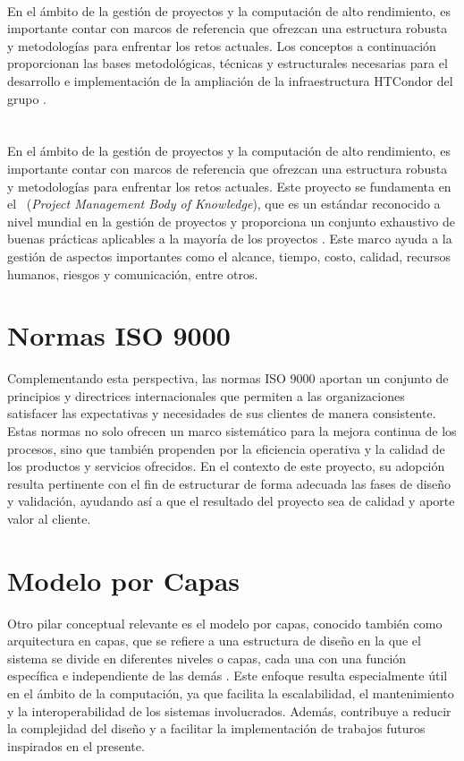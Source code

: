 \label{cap:marcoTeorico}
\mbox{}\\
\noindent
En el ámbito de la gestión de proyectos y la computación de alto rendimiento, es importante contar con marcos de referencia que ofrezcan una estructura robusta y metodologías para enfrentar los retos actuales. Los conceptos a continuación proporcionan las bases metodológicas, técnicas y estructurales necesarias para el desarrollo e implementación de la ampliación de la infraestructura HTCondor del grupo \GRID.

\section{\PMBOK}
\noindent
En el ámbito de la gestión de proyectos y la computación de alto rendimiento, es importante contar con marcos de referencia que ofrezcan una estructura robusta y metodologías para enfrentar los retos actuales. Este proyecto se fundamenta en el \PMBOK~(\textit{Project Management Body of Knowledge}), que es un estándar reconocido a nivel mundial en la gestión de proyectos y proporciona un conjunto exhaustivo de buenas prácticas aplicables a la mayoría de los proyectos \citep{PMI2019}. Este marco ayuda a la gestión de aspectos importantes como el alcance, tiempo, costo, calidad, recursos humanos, riesgos y comunicación, entre otros.

\section{Normas ISO 9000}
\noindent
Complementando esta perspectiva, las normas ISO 9000 aportan un conjunto de principios y directrices internacionales que permiten a las organizaciones satisfacer las expectativas y necesidades de sus clientes de manera consistente. Estas normas no solo ofrecen un marco sistemático para la mejora continua de los procesos, sino que también propenden por la eficiencia operativa y la calidad de los productos y servicios ofrecidos. En el contexto de este proyecto, su adopción resulta pertinente con el fin de estructurar de forma adecuada las fases de diseño y validación, ayudando así a que el resultado del proyecto sea de calidad y aporte valor al cliente.

\section{Modelo por Capas}
\noindent
Otro pilar conceptual relevante es el modelo por capas, conocido también como arquitectura en capas, que se refiere a una estructura de diseño en la que el sistema se divide en diferentes niveles o capas, cada una con una función específica e independiente de las demás \citep{Spray2023}. Este enfoque resulta especialmente útil en el ámbito de la computación, ya que facilita la escalabilidad, el mantenimiento y la interoperabilidad de los sistemas involucrados. Además, contribuye a reducir la complejidad del diseño y a facilitar la implementación de trabajos futuros inspirados en el presente.

